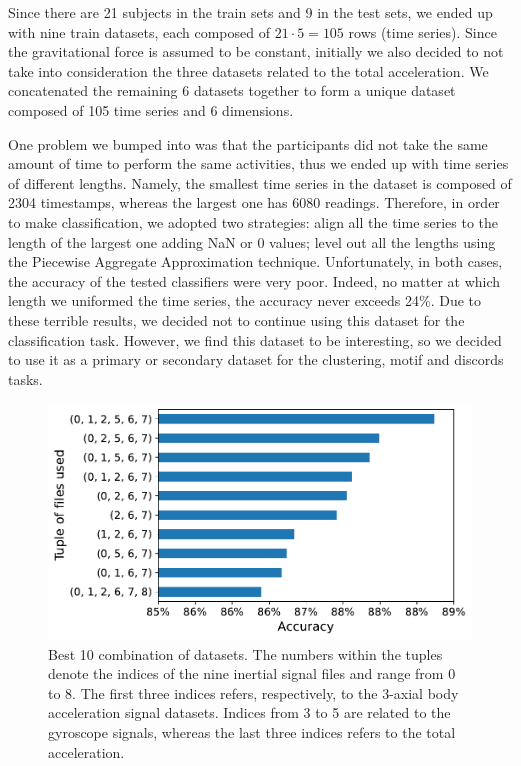 \documentclass[10pt, a4paper, twocolumn]{article}
\begin{document}
Since there are 21 subjects in the train sets and 9 in the test sets, we ended up with nine train datasets, each composed of $21 \cdot 5=105$ rows (time series). Since the gravitational force is assumed to be constant, initially we also decided to not take into consideration the three datasets related to the total acceleration. We concatenated the remaining 6 datasets together to form a unique dataset composed of 105 time series and 6 dimensions.

One problem we bumped into was that the participants did not take the same amount of time to perform the same activities, thus we ended up with time series of different lengths. Namely, the smallest time series in the dataset is composed of 2304 timestamps, whereas the largest one has 6080 readings. Therefore, in order to make classification, we adopted two strategies: align all the time series to the length of the largest one adding NaN or 0 values; level out all the lengths using the Piecewise Aggregate Approximation technique. Unfortunately, in both cases, the accuracy of the tested classifiers were very poor. Indeed, no matter at which length we uniformed the time series, the accuracy never exceeds 24\%. Due to these terrible results, we decided not to continue using this dataset for the classification task. However, we find this dataset to be interesting, so we decided to use it as a primary or secondary dataset for the clustering, motif and discords tasks. 

\begin{figure}[t]
    \centering
    \includegraphics[width=0.7\linewidth]{immagini simone/output_56_0.pdf}
    \caption{Best 10 combination of datasets. The numbers within the tuples denote the indices of the nine inertial signal files and range from 0 to 8. The first three indices refers, respectively, to the 3-axial body acceleration signal datasets. Indices from 3 to 5 are related to the gyroscope signals, whereas the last three indices refers to the total acceleration.}
    \label{fig:best10_accuracy}
\end{figure}
\end{document}
